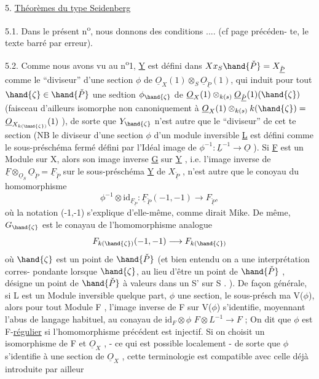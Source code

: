 
5. \uline{Th\'eor\`emes du type Seidenberg}

5.1.
Dans le pr\'esent n\textsuperscript{o}, nous donnons des conditions .... (cf page pr\'ec\'eden-%
te, le texte barr\'e par erreur).

5.2. Comme nous avons vu au n\textsuperscript{o}1, \underline{Y} est d\'efini dans $X x_S \hand{\check{P}} = X_{\check{\underline{P}}}$
comme le ``diviseur'' d'une section $\phi$ de $\underline{O}_X(1)\otimes_S \underline{O}_{\check{\underline{P}}}(1)$, qui induit pour
tout $\hand{\zeta} \in \hand{\check{P}}$ une sedtion $\phi_{\hand{\zeta}}$ de  $\underline{O}_X(1)\otimes_{k(s)}\underline{O}_{\check{\underline{P}}}(1)(\hand{\zeta})$
(faisceau d'ailleurs isomorphe non canoniquement \`a $\underline{O}_X(1)\otimes_{k(s)}k(\hand{\zeta}) =$
$\underline{O}_{X_{k(\hand{\zeta})}}(1)$ ), de sorte que $Y_{\hand{\zeta}}$ n'est autre que le  ``diviseur'' de cet
te section (NB le diviseur d'une section $\phi$ d'un module inversible \underline{L} \placedmargin{$/\!/$}
est d\'efini comme le sous-pr\'esch\'ema ferm\'e d\'efini par l'Id\'eal image de
$\phi^{-1} : \underline{L}^{-1} \longrightarrow \underline{O}$ ). Si \underline{F} est un Module sur X, alors son image inverse \underline{G}
sur \underline{Y} , i.e. l'image inverse de $\underline{F}\otimes_{\underline{O}_S}\underline{O}_{\check{\underline{P}}} = \underline{F}_{\check{\underline{P}}}$ sur le sous-pr\'esch\'ema \underline{Y} de
$X_{\check{\underline{P}}}$ , n'est autre que le conoyau du homomorphisme
\[ \phi^{-1}\otimes \mathrm{id}_{\underline{F}_{\check{\underline{P}}}} : \underline{F}_{\check{\underline{P}}}(-1,-1) \longrightarrow F_{\check{\underline{P}}} , \]
o\`u la notation (-1,-1) s'explique d'elle-m\^eme, comme dirait Mike. De
m\^eme, $G_{\hand{\zeta}}$ est le conayau de l'homomorphisme analogue
\[ F_{k(\hand{\zeta})}(-1,-1) \longrightarrow F_{k(\hand{\zeta})} \]
o\`u $\hand{\zeta}$ est un point de $\hand{\check{P}}$ (et bien entendu on a une interpr\'etation corres-%
pondante lorsque $\hand{\zeta}$, au lieu d'\^etre un point de $\hand{\check{P}}$ , d\'esigne un point
de $\hand{\check{P}}$ \`a valeurs dans un S' sur S . ). \hand{\unsure{(}}De fa\c{c}on g\'en\'erale, si L est un
Module inversible quelque part, $\phi$ une section,  le sous-pr\'esch
ma V($\phi$), alors pour tout Module F , l'image inverse de F sur V($\phi$)
s'identifie, moyennant l'abus de langage habituel, au conayau de $\mathrm{id}_F\otimes\phi$
$F\otimes L^{-1} \longrightarrow F$ ; On dit que $\phi$ est F-\uline{r\'egulier} si l'homomorphisme pr\'ec\'edent
est injectif. Si on choisit un isomorphisme de F et $\underline{O}_X$ , - ce qui
est possible localement - de sorte que $\phi$ s'identifie \`a une section de
$\underline{O}_X$ , cette terminologie est compatible avec celle d\'ej\`a introduite par ailleur

